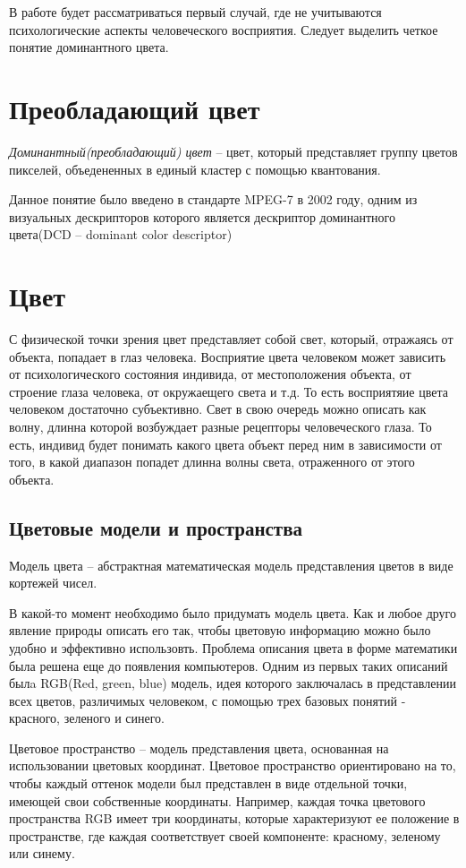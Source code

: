 В работе будет рассматриваться первый случай, где не учитываются психологические аспекты человеческого восприятия. Следует выделить четкое понятие доминантного цвета.

\section{ Преобладающий цвет}
\textit{Доминантный(преобладающий) цвет} -- цвет, который представляет группу цветов пикселей, объедененных в единый кластер с помощью квантования. 

Данное понятие было введено в стандарте MPEG-7 в 2002 году, одним из визуальных дескрипторов которого является дескриптор доминантного цвета(DCD -- dominant color descriptor)

\section{ Цвет}
С физической точки зрения цвет представляет собой свет, который, отражаясь от объекта, попадает в глаз человека. Восприятие цвета человеком может зависить от психологического состояния индивида, от местоположения объекта, от строение глаза человека, от окружаещего света и т.д. То есть восприятяие цвета человеком достаточно субъективно. Свет в свою очередь можно описать как волну, длинна которой возбуждает разные рецепторы человеческого глаза. То есть, индивид будет понимать какого цвета объект перед ним в зависимости от того, в какой диапазон попадет длинна волны света, отраженного от этого объекта.

\subsection{ Цветовые модели и пространства}

Модель цвета -- абстрактная математическая модель представления цветов в виде кортежей чисел.

В какой-то момент необходимо было придумать модель цвета. Как и любое друго явление природы описать его так, чтобы цветовую информацию можно было удобно и эффективно использовть. Проблема описания цвета в форме математики была решена еще до появления компьютеров. Одним из первых таких описаний былa RGB(Red, green, blue) модель, идея которого заключалась в представлении всех цветов, различимых человеком, с помощью трех базовых понятий - красного, зеленого и синего. 

Цветовое пространство -- модель представления цвета, основанная на использовании цветовых координат. Цветовое пространство ориентировано на то, чтобы каждый оттенок модели был представлен в виде отдельной точки, имеющей свои собственные координаты. Например, каждая точка цветового пространства RGB имеет три координаты, которые характеризуют ее положение в пространстве, где каждая соответствует своей компоненте: красному, зеленому или синему.

